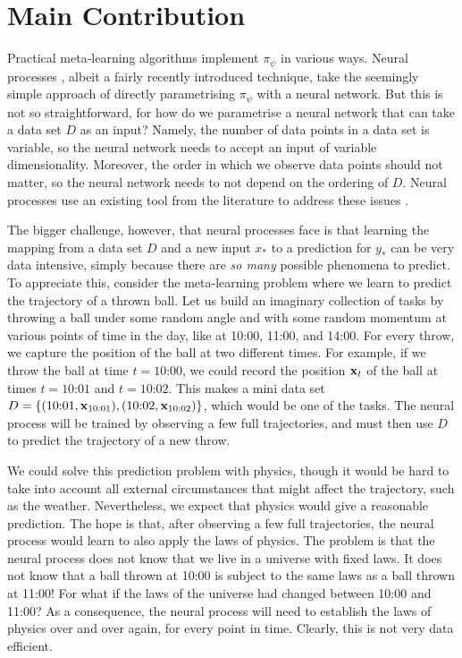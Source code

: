 \documentclass[12pt, twoside]{report}
\begin{document}
\section{Main Contribution}
\label{sec:introduction:main_contribution}
Practical meta-learning algorithms implement $\pi_\psi$ in various ways.
Neural processes \parencite[NPs;][]{Garnelo:2018:Conditional_Neural_Processes,Garnelo:2018:Neural_Processes}, albeit a fairly recently introduced technique, take the seemingly simple approach of directly parametrising $\pi_\psi$ with a neural network.
But this is not so straightforward, for
how do we parametrise a neural network that can take a data set $D$ as an input?
Namely, the number of data points in a data set is variable, so the neural network needs to accept an input of variable dimensionality.
Moreover, the order in which we observe data points should not matter, so the neural network needs to not depend on the ordering of $D$.
Neural processes use an existing tool from the literature to address these issues \parencite{Zaheer:2017:Deep_Sets,Edwards:2017:Towards_a_Neural_Statistician}.

The bigger challenge, however, that neural processes face is that learning the mapping from a data set $D$ and a new input $x_*$ to a prediction for $y_*$ can be very data intensive, simply because there are \emph{so many} possible phenomena to predict.
To appreciate this, consider the meta-learning problem where we learn to predict the trajectory of a thrown ball.
Let us build an imaginary collection of tasks by 
throwing a ball under some random angle and with some random momentum
at various points of time in the day, like at 10:00, 11:00, and 14:00.
For every throw, we capture the position of the ball at two different times.
For example, if we throw the ball at time $t=\text{10:00}$, we could record the position $\mathbf{x}_t$ of the ball at times $t=\text{10:01}$ and $t=\text{10:02}$.
This makes a mini data set $D=\{(\text{10:01}, \mathbf{x}_\text{10:01}), (\text{10:02}, \mathbf{x}_\text{10:02})\}$, which would be one of the tasks.
The neural process will be trained by observing a few full trajectories, and must then use $D$ to predict the trajectory of a new throw.

We could solve this prediction problem with physics, though it would be hard to take into account all external circumstances that might affect the trajectory, such as the weather.
Nevertheless, we expect that physics would give a reasonable prediction.
The hope is that, after observing a few full trajectories, the neural process would learn to also apply the laws of physics.
The problem is that the neural process does not know that we live in a universe with fixed laws.
It does not know that a ball thrown at 10:00 is subject to the same laws as a ball thrown at 11:00!
For what if the laws of the universe had changed between 10:00 and 11:00?
As a consequence, the neural process will need to establish the laws of physics over and over again, for every point in time.
Clearly, this is not very data efficient.
\end{document}
